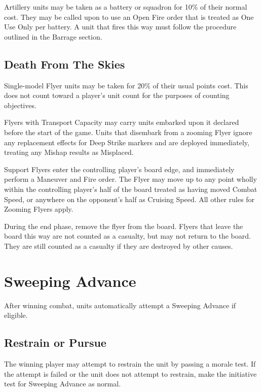 \documentclass[letterpaper,twocolumn,oneside,titlepage]{book}
\begin{document}
Artillery units may be taken as a battery or squadron for 10\% of their
normal cost. They may be called upon to use an Open Fire order that is
treated as One Use Only per battery. A unit that fires this way must
follow the procedure outlined in the Barrage section.

\subsection{\texorpdfstring{\textbf{Death From The
Skies}}{Death From The Skies}}\label{death-from-the-skies}

Single-model Flyer units may be taken for 20\% of their usual points
cost. This does not count toward a player's unit count for the purposes
of counting objectives.

Flyers with Transport Capacity may carry units embarked upon it declared
before the start of the game. Units that disembark from a zooming Flyer
ignore any replacement effects for Deep Strike markers and are deployed
immediately, treating any Mishap results as Misplaced.

Support Flyers enter the controlling player's board edge, and
immediately perform a Maneuver and Fire order. The Flyer may move up to
any point wholly within the controlling player's half of the board
treated as having moved Combat Speed, or anywhere on the opponent's half
as Cruising Speed. All other rules for Zooming Flyers apply.

During the end phase, remove the flyer from the board. Flyers that leave
the board this way are not counted as a casualty, but may not return to
the board. They are still counted as a casualty if they are destroyed by
other causes.

\section{\texorpdfstring{\textbf{Sweeping
Advance}}{Sweeping Advance}}\label{sweeping-advance}

After winning combat, units automatically attempt a Sweeping Advance if
eligible.

\subsection{\texorpdfstring{\textbf{Restrain or
Pursue}}{Restrain or Pursue}}\label{restrain-or-pursue}

The winning player may attempt to restrain the unit by passing a morale
test. If the attempt is failed or the unit does not attempt to restrain,
make the initiative test for Sweeping Advance as normal.
\end{document}
